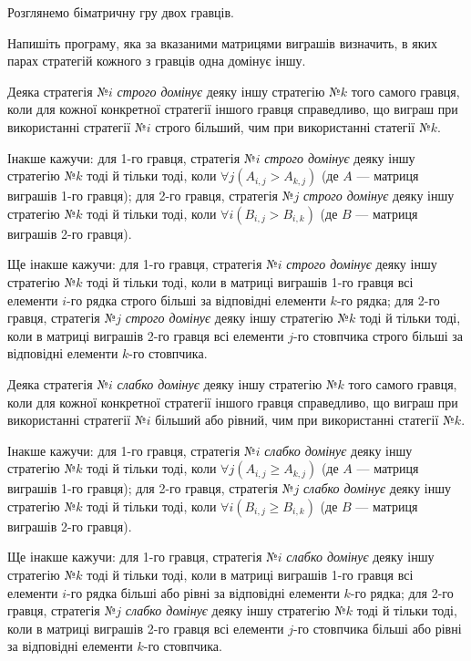 ﻿Розглянемо біматричну гру двох гравців.

Напишіть програму, яка за вказаними матрицями виграшів визначить, в яких парах стратегій кожного з гравців одна домінує іншу.

Деяка стратегія №$i$ \emph{строго домінує} деяку іншу стратегію №$k$ того самого гравця, коли для кожної конкретної стратегії іншого гравця справедливо, що виграш при використанні стратегії №$i$ строго більший, чим при використанні статегії №$k$.

Інакше кажучи: 
для 1-го гравця, стратегія №$i$ \emph{строго домінує} деяку іншу стратегію №$k$ тоді й тільки тоді, коли
$
\forall j (A_{i,j} > A_{k,j})
$
(де $A$ --- матриця виграшів 1-го гравця);
для 2-го гравця, стратегія №$j$ \emph{строго домінує} деяку іншу стратегію №$k$ тоді й тільки тоді, коли
$
\forall i (B_{i,j} > B_{i,k})
$
(де $B$ --- матриця виграшів 2-го гравця).

Ще інакше кажучи:
для 1-го гравця, стратегія №$i$ \emph{строго домінує} деяку іншу стратегію №$k$ тоді й тільки тоді, коли
в матриці виграшів 1-го гравця всі елементи $i$-го рядка строго більші за відповідні елементи $k$-го рядка;
для 2-го гравця, стратегія №$j$ \emph{строго домінує} деяку іншу стратегію №$k$ тоді й тільки тоді, коли
в матриці виграшів 2-го гравця всі елементи $j$-го стовпчика строго більші за відповідні елементи $k$-го стовпчика.


Деяка стратегія №$i$ \emph{слабко домінує} деяку іншу стратегію №$k$ того самого гравця, коли для кожної конкретної стратегії іншого гравця справедливо, що виграш при використанні стратегії №$i$ більший або рівний, чим при використанні статегії №$k$.

Інакше кажучи: 
для 1-го гравця, стратегія №$i$ \emph{слабко домінує} деяку іншу стратегію №$k$ тоді й тільки тоді, коли
$
\forall j (A_{i,j} \geqslant A_{k,j})
$
(де $A$ --- матриця виграшів 1-го гравця);
для 2-го гравця, стратегія №$j$ \emph{слабко домінує} деяку іншу стратегію №$k$ тоді й тільки тоді, коли
$
\forall i (B_{i,j} \geqslant B_{i,k})
$
(де $B$ --- матриця виграшів 2-го гравця).

Ще інакше кажучи:
для 1-го гравця, стратегія №$i$ \emph{слабко домінує} деяку іншу стратегію №$k$ тоді й тільки тоді, коли
в матриці виграшів 1-го гравця всі елементи $i$-го рядка більші або рівні за відповідні елементи $k$-го рядка;
для 2-го гравця, стратегія №$j$ \emph{слабко домінує} деяку іншу стратегію №$k$ тоді й тільки тоді, коли
в матриці виграшів 2-го гравця всі елементи $j$-го стовпчика більші або рівні за відповідні елементи $k$-го стовпчика.


